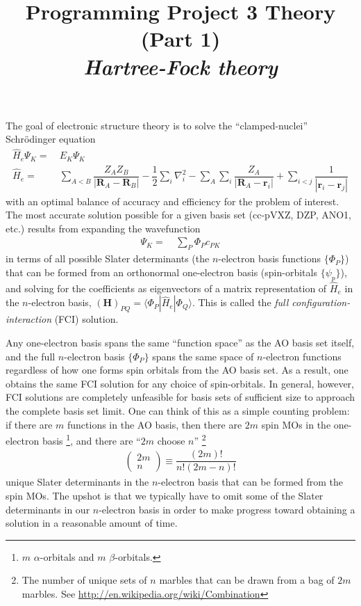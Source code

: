 \documentclass[11pt]{article}
\title{Programming Project 3 Theory (Part 1)\\
\textit{Hartree-Fock theory}}
\date{}
\author{}
\newcommand{\F}{\ensuremath{\Phi}}
\newcommand{\y}{\ensuremath{\psi}}
\newcommand{\Y}{\ensuremath{\Psi}}
\newcommand{\A}{\ensuremath{\alpha}}
\newcommand{\B}{\ensuremath{\beta}}
\newcommand{\op}[1]{\ensuremath{ \hat{#1} } }
\newcommand{\bo}[1]{\ensuremath{\mathbf{#1}}}
\newcommand{\fr}[2]{\ensuremath{ \dfrac{#1}{#2} }}
\newcommand{\ip}[1]{\ensuremath{\langle #1\rangle}}
\newcommand{\ma}[1]{\ensuremath{\left(\begin{matrix} #1 \end{matrix}\right)}}
\theoremstyle{indented}
\begin{document}
\maketitle
\vspace{-1cm}

\noindent
The goal of electronic structure theory is to solve the ``clamped-nuclei'' Schr\"odinger equation
\begin{align}
\label{se}
	\op{H}_e\Y_K
=&\
	E_K\Y_K
\\
	\op{H}_e
=&\
\sum_{A<B}
	\fr{Z_AZ_B}{|\bo{R}_A-\bo{R}_B|}
-\fr{1}{2}\sum_i
	\nabla_i^2
-\sum_A\sum_i
	\fr{Z_A}{|\bo{R}_A-\bo{r}_i|}
+\sum_{i<j}
	\fr{1}{|\bo{r}_i-\bo{r}_j|}
\end{align}
with an optimal balance of accuracy and efficiency for the problem of interest.
The most accurate solution possible for a given basis set (cc-pVXZ, DZP, ANO1, etc.) results from expanding the wavefunction
\begin{align}
\label{n-e-expansion}
	\Y_K
=&\
	\sum_P
	\F_P c_{PK}
\end{align}
in terms of all possible Slater determinants (the $n$-electron basis functions $\{\F_P\}$) that can be formed from an orthonormal one-electron basis (spin-orbitals $\{\y_p\}$), and solving for the coefficients as eigenvectors of a matrix representation of $\op{H}_e$ in the $n$-electron basis, $(\bo{H})_{PQ}=\ip{\F_P|\op{H}_e|\F_Q}$.
This is called the {\it full configuration-interaction} (FCI) solution.

Any one-electron basis spans the same ``function space'' as the AO basis set itself, and the full $n$-electron basis $\{\F_P\}$ spans the same space of $n$-electron functions regardless of how one forms spin orbitals from the AO basis set.
As a result, one obtains the same FCI solution for any choice of spin-orbitals.
In general, however, FCI solutions are completely unfeasible for basis sets of sufficient size to approach the complete basis set limit.
One can think of this as a simple counting problem: if there are $m$ functions in the AO basis, then there are $2m$ spin MOs in the one-electron basis \footnote{$m$ $\A$-orbitals and $m$ $\B$-orbitals.}, and there are ``$2m$ choose $n$'' \footnote{The number of unique sets of $n$ marbles that can be drawn from a bag of $2m$ marbles.  See \url{http://en.wikipedia.org/wiki/Combination}}
\begin{align*}
\ma{2m\\n}\equiv\fr{(2m)!}{n!(2m-n)!}
\end{align*}
unique Slater determinants in the $n$-electron basis that can be formed from the spin MOs.
The upshot is that we typically have to omit some of the Slater determinants in our $n$-electron basis in order to make progress toward obtaining a solution in a reasonable amount of time.
\end{document}
